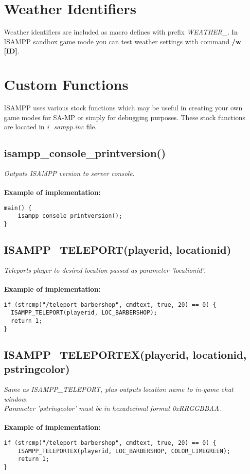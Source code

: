 \documentclass{article}
\begin{document}
\section{Weather Identifiers}
Weather identifiers are included as macro defines with prefix \textit{WEATHER\_}. In ISAMPP sandbox game mode you can test weather settings with command \textbf{/w [ID]}.


\newpage
\section{Custom Functions}

ISAMPP uses various stock functions which may be useful in creating your own game modes for SA-MP or simply for debugging purposes. These stock functions are located in \textit{i\_sampp.inc} file.
\\
\subsection{isampp\_console\_printversion()}

\textit{Outputs ISAMPP version to server console.}
\\
\\
\textbf{Example of implementation:}
\begin{verbatim}
main() {
    isampp_console_printversion();
}
\end{verbatim}



\subsection{ISAMPP\_TELEPORT(playerid, locationid)}

\textit{Teleports player to desired location passed as parameter 'locationid'.}
\\
\\
\textbf{Example of implementation:}
\begin{verbatim}
if (strcmp("/teleport barbershop", cmdtext, true, 20) == 0) {
  ISAMPP_TELEPORT(playerid, LOC_BARBERSHOP);
  return 1;
}
\end{verbatim}


\subsection{ISAMPP\_TELEPORTEX(playerid, locationid, pstringcolor)}

\textit{Same as ISAMPP\_TELEPORT, plus outputs location name to in-game chat window. \\Parameter 'pstringcolor' must be in hexadecimal format 0xRRGGBBAA.}
\\
\\
\textbf{Example of implementation:}
\begin{verbatim}
if (strcmp("/teleport barbershop", cmdtext, true, 20) == 0) {
    ISAMPP_TELEPORTEX(playerid, LOC_BARBERSHOP, COLOR_LIMEGREEN);
    return 1;
}
\end{verbatim}
\end{document}
